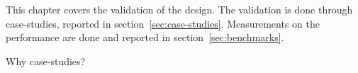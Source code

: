 This chapter covers the validation of the design. The validation is done through case-studies, reported in section~\ref{sec:case-studies}. Measurements on the performance are done and reported in section~\ref{sec:benchmarks}.

Why case-studies? 

